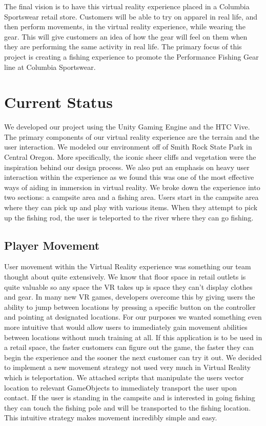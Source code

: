 \documentclass[10pt,journal,compsoc,onecolumn, draftclsnofoot]{IEEEtran}
\begin{document}
The final vision is to have this virtual reality experience placed in a Columbia Sportswear retail store.
Customers will be able to try on apparel in real life, and then perform movements, in the virtual reality experience, while wearing the gear.
This will give customers an idea of how the gear will feel on them when they are performing the same activity in real life.
The primary focus of this project is creating a fishing experience to promote the Performance Fishing Gear line at Columbia Sportswear.


\section{Current Status}
We developed our project using the Unity Gaming Engine and the HTC Vive. The primary components of our virtual reality experience are the terrain and the user interaction. We modeled our environment off of Smith Rock State Park in Central Oregon. More specifically, the iconic sheer cliffs and vegetation were the inspiration behind our design process. We also put an emphasis on heavy user interaction within the experience as we found this was one of the most effective ways of aiding in immersion in virtual reality. We broke down the experience into two sections: a campsite area and a fishing area. Users start in the campsite area where they can pick up and play with various items. When they attempt to pick up the fishing rod, the user is teleported to the river where they can go fishing.

\subsection{Player Movement}
User movement within the Virtual Reality experience was something our team thought about quite extensively. We know that floor space in retail outlets is quite valuable so any space the VR takes up is space they can’t display clothes and gear. In many new VR games, developers overcome this by giving users the ability to jump between locations by pressing a specific button on the controller and pointing at designated locations. For our purposes we wanted something even more intuitive that would allow users to immediately gain movement abilities between locations without much training at all. If this application is to be used in a retail space, the faster customers can figure out the game, the faster they can begin the experience and the sooner the next customer can try it out. We decided to implement a new movement strategy not used very much in Virtual Reality which is teleportation. We attached scripts that manipulate the users vector location to relevant GameObjects to immediately transport the user upon contact. If the user is standing in the campsite and is interested in going fishing they can touch the fishing pole and will be transported to the fishing location. This intuitive strategy makes movement incredibly simple and easy.
\end{document}
